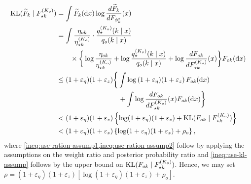 \begin{align}
	\kl{\widetilde{F}_{k}}{F^{(\numcomps_{o})}_{\opt k} } & = \int \widetilde{F}_{k}(\dee x)\log\frac{d \widetilde{F}_{k}}{dF_{\phi^{\opt}_{k}}}(x)      \\
	    & = \int \frac{\eta_{ok}}{\eta^{(\numcomps_{o})}_{\star k}}\cdot \frac{q_{\star}^{(\numcomps_{o})}(k \mid x)}{q_{o}(k \mid x)}\\
	    & \qquad \times \bigg\{\log\frac{\eta_{ok}}{\eta^{(\numcomps_{o})}_{\star k}} + \log\frac{q_{\star}^{(\numcomps_{o})}(k \mid x)}{q_{o}(k \mid x)} + \log\frac{dF_{ok}}{dF^{(\numcomps_{o})}_{\opt k}}(x)    \bigg\}  F_{ok}(\dee x)  \\
	   & \le (1+\varepsilon_{\eta})(1+\varepsilon_{z})\bigg\{\int \log \left(1+\varepsilon_{\eta})(1+\varepsilon_{z}\right) F_{ok}(\dee x)  \label{ineq:use-ration-assump1}  \\
	  & \phantom{\le (1+\varepsilon_{\eta})(1+\varepsilon_{z})\bigg\{~}  + \int  \log\frac{dF_{ok}}{dF^{(\numcomps_{o})}_{\opt k}}(x)  F_{ok}(\dee x)   \bigg\}   \\
	   & < (1+\varepsilon_{\eta})(1+\varepsilon_{z})\left\{\log (1+\varepsilon_{\eta})(1+\varepsilon_{z}) + \kl{F_{ok}}{F^{(\numcomps_{o})}_{\opt k}}  \right\}  \label{ineq:use-ration-assump2}                                                               \\
	  & < (1+\varepsilon_{\eta})(1+\varepsilon_{z})\left\{\log (1+\varepsilon_{\eta})(1+\varepsilon_{z}) + \rho_o\right\} \label{ineq:use-kl-assump},
\end{align}
where \cref{ineq:use-ration-assump1,ineq:use-ration-assump2} follow by applying the assumptions on the weight ratio and posterior probability ratio and \cref{ineq:use-kl-assump} follows by the upper bound on $\mathrm{KL}(F_{ok} \mid F^{(K_{o})}_{\star k})$. Hence, we may set $\rho = (1+\varepsilon_{\eta})(1+\varepsilon_{z})\left[\log (1+\varepsilon_{\eta})(1+\varepsilon_{z}) + \rho_o \right]$.

